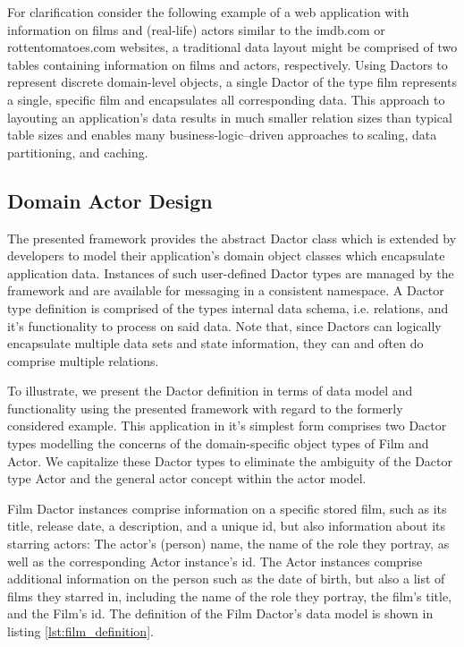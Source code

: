 For clarification consider the following example of a web application with information on films and (real-life) actors similar to the imdb.com or rottentomatoes.com websites, a traditional data layout might be comprised of two tables containing information on films and actors, respectively.
Using Dactors to represent discrete domain-level objects, a single Dactor of the type film represents a single, specific film and encapsulates all corresponding data.
This approach to layouting an application's data results in much smaller relation sizes than typical table sizes and enables many business-logic--driven approaches to scaling, data partitioning, and caching.

\subsection{Domain Actor Design}\label{subsec:domain_actor_design}

The presented framework provides the abstract Dactor class which is extended by developers to model their application's domain object classes which encapsulate application data.
Instances of such user-defined Dactor types are managed by the framework and are available for messaging in a consistent namespace.
A Dactor type definition is comprised of the types internal data schema, i.e. relations, and it's functionality to process on said data.
Note that, since Dactors can logically encapsulate multiple data sets and state information, they can and often do comprise multiple relations.

To illustrate, we present the Dactor definition in terms of data model and functionality using the presented framework with regard to the formerly considered example.
This application in it's simplest form comprises two Dactor types modelling the concerns of the domain-specific object types of Film and Actor.
We capitalize these Dactor types to eliminate the ambiguity of the Dactor type Actor and the general actor concept within the actor model.

Film Dactor instances comprise information on a specific stored film, such as its title, release date, a description, and a unique id, but also information about its starring actors:
The actor's (person) name, the name of the role they portray, as well as the corresponding Actor instance's id.
The Actor instances comprise additional information on the person such as the date of birth, but also a list of films they starred in, including the name of the role they portray, the film's title, and the Film's id.
The definition of the Film Dactor's data model is shown in listing \ref{lst:film_definition}.

